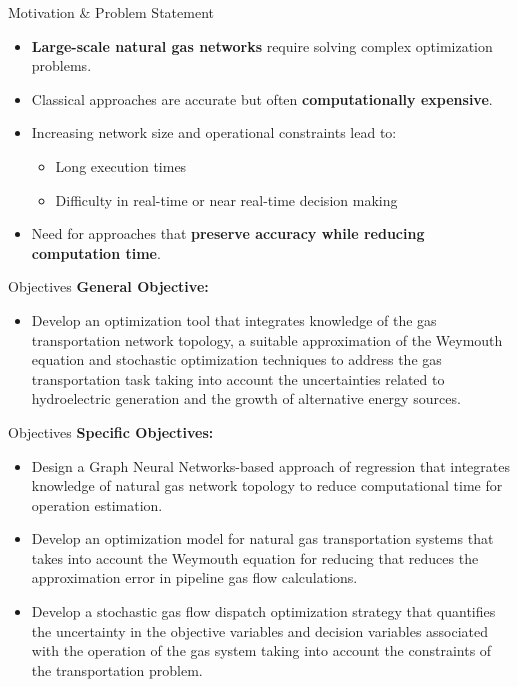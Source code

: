 \documentclass[hyperref={colorlinks,citecolor=blue,linkcolor=blue,urlcolor=blue}]{beamer}
\begin{document}
\begin{frame}{Motivation \& Problem Statement}
\justifying
\begin{itemize}
    \item \textbf{Large-scale natural gas networks} require solving complex optimization problems.
    \item Classical approaches are accurate but often \textbf{computationally expensive}.
    \item Increasing network size and operational constraints lead to:
    \begin{itemize}
        \item Long execution times
        \item Difficulty in real-time or near real-time decision making
    \end{itemize}
    \item Need for approaches that \textbf{preserve accuracy while reducing computation time}.
\end{itemize}
\end{frame}


\begin{frame}{Objectives}
\textbf{General Objective:}
\begin{itemize}
    \item Develop an optimization tool that integrates knowledge of the gas transportation network topology, a suitable approximation of the Weymouth equation and stochastic optimization techniques to address the gas transportation task taking into account the uncertainties related to hydroelectric generation and the growth of alternative energy sources.
\end{itemize}
\end{frame}

\begin{frame}{Objectives}
\textbf{Specific Objectives:}
\begin{itemize}
    \item Design a Graph Neural Networks-based approach of regression that integrates knowledge of natural gas network topology to reduce computational time for operation estimation.    
    \item Develop an optimization model for natural gas transportation systems that takes into account the Weymouth equation for reducing that reduces the approximation error in pipeline gas flow calculations.
    \item Develop a stochastic gas flow dispatch optimization strategy that quantifies the uncertainty in the objective variables and decision variables associated with the operation of the gas system taking into account the constraints of the transportation problem.
\end{itemize}
\end{frame}
\end{document}
